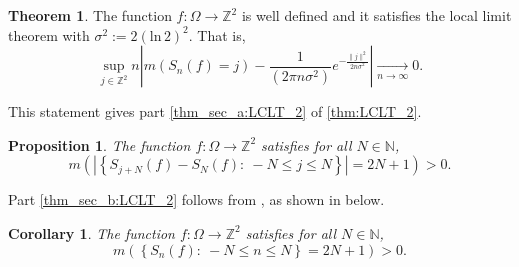 \documentclass[12pt,reqno]{amsart}
\newcommand{\N}{\mathbb{N}}
\newcommand{\Z}{\mathbb{Z}}
\newtheorem{prop}[thm]{Proposition}
\newtheorem{cor}[thm]{Corollary}
\theoremstyle{definition}
\newtheorem*{thm*}{Theorem}
\begin{document}
\begin{thm*}\cite[Theorem 2.4.]{kosloff_Sanadhya_2024} The function $f:\Omega \to\mathbb{Z}^2$ is well defined and it satisfies the local limit theorem with $\sigma^2 := 2(\mathrm{ln}\, 2)^2 $. That is,
\[
\sup_{j\in\Z^2} n\left|m\left(S_n(f)=j\right)-\frac{1}{(2\pi n\sigma^2)}e^{-\frac{\|j\|^2}{2n\sigma^2}}\right|\xrightarrow[n\to\infty]{}0.
\]
\end{thm*} 
This statement gives part \ref{thm_sec_a:LCLT_2} of \cref{thm:LCLT_2}.
\begin{prop}\label{prop: 2nd property of LCLT function}
The function $f:\Omega \to\mathbb{Z}^2$  satisfies for all $N\in\N$, 
$$m\left(\left|\left\{S_{j+N}(f)-S_N(f):\ -N\leq j\leq N\right\}\right|=2N+1\right)>0.$$ 
\end{prop}
 Part \ref{thm_sec_b:LCLT_2} follows from , as shown in  below. 
\begin{cor} \label{cor: 2nd property of LCLT function}
The function $f:\Omega \to\mathbb{Z}^2$  satisfies for all $N\in\N$, 
\[
m\left(\left\{S_n(f):\ -N\leq n\leq N\right\}=2N+1\right)>0. 
\]
\end{cor}
\end{document}
